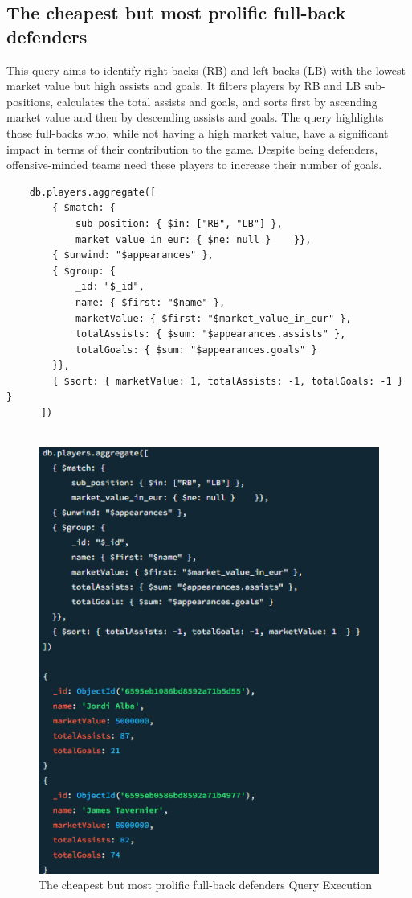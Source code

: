 \documentclass{Configuration_Files/PoliMi3i_thesis}
\begin{document}
\subsection{The cheapest but most prolific full-back defenders}
This query aims to identify right-backs (RB) and left-backs (LB) with the lowest market value but high assists and goals. It filters players by RB and LB sub-positions, calculates the total assists and goals, and sorts first by ascending market value and then by descending assists and goals. The query highlights those full-backs who, while not having a high market value, have a significant impact in terms of their contribution to the game. Despite being defenders, offensive-minded teams need these players to increase their number of goals.

\begin{verbatim}
    db.players.aggregate([
        { $match: { 
            sub_position: { $in: ["RB", "LB"] },
            market_value_in_eur: { $ne: null }    }},
        { $unwind: "$appearances" },
        { $group: { 
            _id: "$_id", 
            name: { $first: "$name" },
            marketValue: { $first: "$market_value_in_eur" },
            totalAssists: { $sum: "$appearances.assists" },
            totalGoals: { $sum: "$appearances.goals" }
        }},
        { $sort: { marketValue: 1, totalAssists: -1, totalGoals: -1 } }
      ])
      
\end{verbatim}
\begin{figure}[htbp]
    \centering
    \includegraphics[scale=1.1]{Images/Queries/Cheapest_prolific_full_backs/cpfb.png}
    \caption{The cheapest but most prolific full-back defenders Query Execution}
\end{figure}
\end{document}
